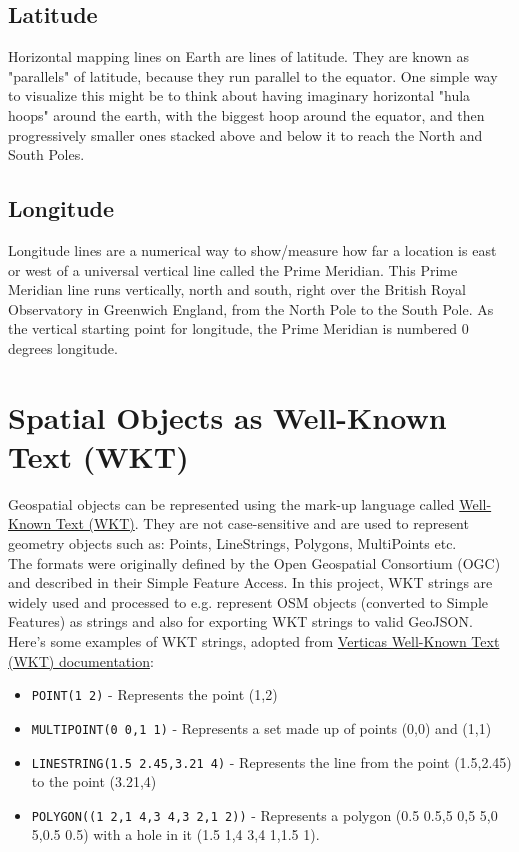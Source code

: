 \subsection{Latitude}
Horizontal mapping lines on Earth are lines of latitude.
They are known as "parallels" of latitude, because they run parallel to the equator.
One simple way to visualize this might be to think about having imaginary horizontal "hula hoops" around the earth,
with the biggest hoop around the equator, and then progressively smaller ones stacked above and
below it to reach the North and South Poles.~\cite{JourneyNorthLatitudeLongitude}
\subsection{Longitude}
Longitude lines are a numerical way to show/measure how far a location is east or west of a universal vertical line called the
Prime Meridian.
This Prime Meridian line runs vertically, north and south, right over the British Royal Observatory in
Greenwich England, from the North Pole to the South Pole.
As the vertical starting point for longitude, the Prime Meridian is numbered 0 degrees longitude.~\cite{JourneyNorthLatitudeLongitude}
\section{Spatial Objects as Well-Known Text (WKT)}
Geospatial objects can be represented using the mark-up language called \href{https://www.ogc.org/standards/wkt-crs}{Well-Known Text (WKT)}.
They are not case-sensitive and are used to represent geometry objects such as: Points, LineStrings, Polygons, MultiPoints etc.\\
\newline
The formats were originally defined by the Open Geospatial Consortium (OGC) and described in their Simple Feature Access.
In this project, WKT strings are widely used and processed to e.g. represent OSM objects (converted to Simple Features) as strings and also for exporting
WKT strings to valid GeoJSON.~\cite{OGCWKT}\\
\newline
Here's some examples of WKT strings, adopted from \href{https://www.vertica.com/docs/9.3.x/HTML/Content/Authoring/AnalyzingData/Geospatial/Spatial_Definitions/WellknownTextWKT.htm}{Vertica\textquotesingle s Well-Known Text (WKT) documentation}:~\cite{VerticaWKT}
\begin{itemize}
    \item \texttt{POINT(1 2)} - Represents the point (1,2)
    \item \texttt{MULTIPOINT(0 0,1 1)} - Represents a set made up of points (0,0) and (1,1)
    \item \texttt{LINESTRING(1.5 2.45,3.21 4)} - Represents the line from the point (1.5,2.45) to the point (3.21,4)
    \item \texttt{POLYGON((1 2,1 4,3 4,3 2,1 2))} - Represents a polygon (0.5 0.5,5 0,5 5,0 5,0.5 0.5) with a hole in it (1.5 1,4 3,4 1,1.5 1).
\end{itemize}

